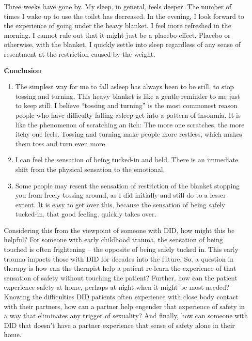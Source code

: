 \documentclass[]{book}
\begin{document}
Three weeks have gone by. My sleep, in general, feels deeper. The number of times I wake up to use the toilet has decreased. In the evening, I look forward to the experience of going under the heavy blanket. I feel more refreshed in the morning. I cannot rule out that it might just be a placebo effect. Placebo or otherwise, with the blanket, I quickly settle into sleep regardless of any sense of resentment at the restriction caused by the weight.

\textbf{Conclusion}

\begin{enumerate}
\def\labelenumi{\arabic{enumi}.}
\item
  The simplest way for me to fall asleep has always been to be still, to stop tossing and turning. This heavy blanket is like a gentle reminder to me just to keep still. I believe ``tossing and turning'' is the most commonest reason people who have difficulty falling asleep get into a pattern of insomnia. It is like the phenomenon of scratching an itch: The more one scratches, the more itchy one feels. Tossing and turning make people more restless, which makes them toss and turn even more.
\item
  I can feel the sensation of being tucked-in and held. There is an immediate shift from the physical sensation to the emotional.
\item
  Some people may resent the sensation of restriction of the blanket stopping you from freely tossing around, as I did initially and still do to a lesser extent. It is easy to get over this, because the sensation of being safely tucked-in, that good feeling, quickly takes over.
\end{enumerate}

Considering this from the viewpoint of someone with DID, how might this be helpful? For someone with early childhood trauma, the sensation of being touched is often frightening -- the opposite of being safely tucked in. This early trauma impacts those with DID for decades into the future. So, a question in therapy is how can the therapist help a patient re-learn the experience of that sensation of safety without touching the patient? Further, how can the patient experience safety at home, perhaps at night when it might be most needed? Knowing the difficulties DID patients often experience with close body contact with their partners, how can a partner help engender that experience of safety in a way that eliminates any trigger of sexuality? And finally, how can someone with DID that doesn't have a partner experience that sense of safety alone in their home.
\end{document}
